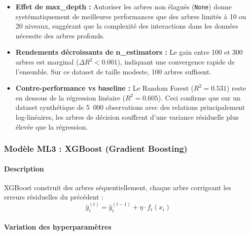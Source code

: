 \documentclass[12pt,a4paper]{article}
\begin{document}
\begin{itemize}[leftmargin=*]
    \item \textbf{Effet de max\_depth :} Autoriser les arbres non élagués
    (\texttt{None}) donne systématiquement de meilleures performances que des arbres
    limités à 10 ou 20 niveaux, suggérant que la complexité des interactions dans les
    données nécessite des arbres profonds.

    \item \textbf{Rendements décroissants de n\_estimators :} Le gain entre 100 et 300
    arbres est marginal ($\Delta R^2 < 0.001$), indiquant une convergence rapide de
    l'ensemble. Sur ce dataset de taille modeste, 100 arbres suffisent.

    \item \textbf{Contre-performance vs baseline :} Le Random Forest ($R^2 = 0.531$)
    reste en dessous de la régression linéaire ($R^2 = 0.605$). Ceci confirme que sur
    un dataset synthétique de 5~000 observations avec des relations principalement
    log-linéaires, les arbres de décision souffrent d'une variance résiduelle plus
    élevée que la régression.
\end{itemize}

\newpage

\subsubsection{Modèle ML3 : XGBoost (Gradient Boosting)}

\paragraph{Description}

XGBoost construit des arbres séquentiellement, chaque arbre corrigeant les erreurs
résiduelles du précédent :
\[
\hat{y}_i^{(t)} = \hat{y}_i^{(t-1)} + \eta \cdot f_t(x_i)
\]

\paragraph{Variation des hyperparamètres}
\end{document}
